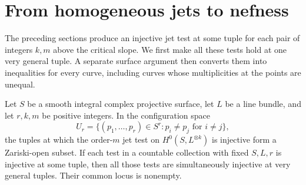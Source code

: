 \section{From homogeneous jets to nefness}\label{sec:nef}

The preceding sections produce an injective jet test at some tuple for
each pair of integers $k,m$ above the critical slope. We first make all
these tests hold at one very general tuple. A separate surface argument
then converts them into inequalities for every curve, including curves
whose multiplicities at the points are unequal.

\begin{lemma}\label{lem:jet-open}
Let $S$ be a smooth integral complex projective surface, let $L$ be a line
bundle, and let $r,k,m$ be positive integers. In the configuration space
\[
 U_r=\{(p_1,\ldots,p_r)\in S^r:p_i\ne p_j\text{ for }i\ne j\},
\]
the tuples at which the order-$m$ jet test on $H^0(S,L^{\otimes k})$
is injective form a Zariski-open subset. If each test in a countable
collection with fixed $S,L,r$ is injective at some tuple, then all those tests are
simultaneously injective at very general tuples. Their common locus is
nonempty.
\end{lemma}


